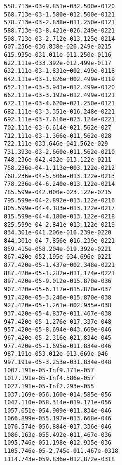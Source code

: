 \begin{alltt}
  55   8.713e-03  -9.851e-03   2.500e-01   20
  56   8.713e-03  -1.580e-01   2.500e-01   21
  57   8.713e-03  -2.838e-01   1.250e-01   21
  58   8.713e-03  -8.421e-02   6.249e-02   21
  59   8.713e-03  -2.712e-01   3.125e-02   14
  60   7.256e-03   6.838e-02   6.249e-02   15
  61   5.935e-03   1.011e-01   1.250e-01   16
  62   2.111e-03   3.392e-01   2.499e-01   17
  63   2.111e-03  -1.831e+00   2.499e-01   18
  64   2.111e-03  -1.826e+00   2.499e-01   19
  65   2.111e-03  -3.941e-01   2.499e-01   20
  66   2.111e-03  -3.192e-01   2.499e-01   21
  67   2.111e-03  -4.620e-02   1.250e-01   21
  68   2.111e-03  -3.351e-01   6.248e-02   21
  69   2.111e-03  -7.616e-02   3.124e-02   21
  70   2.111e-03  -6.614e-02   1.562e-02    7
  71   2.111e-03  -1.366e-01   1.562e-02    8
  72   2.111e-03   3.646e-04   1.562e-02    9
  73   1.393e-03  -2.660e-01   1.562e-02   10
  74   8.236e-04   2.432e-01   3.122e-02   11
  75   8.236e-04  -1.113e+00   3.122e-02   12
  76   8.236e-04  -5.506e-01   3.122e-02   13
  77   8.236e-04  -6.240e-01   3.122e-02   14
  78   5.599e-04   2.000e-02   3.122e-02   15
  79   5.599e-04  -2.892e-01   3.122e-02   16
  80   5.599e-04  -4.183e-01   3.122e-02   17
  81   5.599e-04  -4.180e-01   3.122e-02   18
  82   5.599e-04  -2.841e-01   3.122e-02   19
  83   4.301e-04   1.206e-01   6.239e-02   20
  84   4.301e-04  -7.856e-01   6.239e-02   21
  85   9.415e-05   8.204e-01   9.392e-02   21
  86   7.420e-05   2.195e-03   4.696e-02   21
  87   7.420e-05  -1.437e+00   2.348e-02   21
  88   7.420e-05  -1.282e-01   1.174e-02   21
  89   7.420e-05  -9.012e-01   5.870e-03    6
  90   7.420e-05  -6.117e-01   5.870e-03    7
  91   7.420e-05  -3.246e-01   5.870e-03    8
  92   7.420e-05  -1.261e+00   2.935e-03    8
  93   7.420e-05  -4.837e-01   1.467e-03    8
  94   7.420e-05  -1.276e-01   7.337e-04    8
  95   7.420e-05  -8.694e-04   3.669e-04    6
  96   7.420e-05  -2.316e-02   1.834e-04    5
  97   7.420e-05  -1.695e-01   1.834e-04    6
  98   7.191e-05   3.012e-01   3.669e-04    6
  99   7.191e-05  -3.253e-03   1.834e-04    8
 100   7.191e-05        -Inf   9.171e-05    7
 101   7.191e-05        -Inf   4.586e-05    7
 102   7.191e-05        -Inf   2.293e-05    5
 103   7.169e-05   6.160e-01   4.585e-05    6
 104   7.110e-05   8.314e-01   9.171e-05    6
 105   7.051e-05   4.909e-01   1.834e-04    6
 106   6.899e-05   5.197e-01   3.668e-04    6
 107   6.574e-05   6.884e-01   7.336e-04    6
 108   6.163e-05   5.492e-01   1.467e-03    6
 109   5.746e-05   1.198e-01   2.935e-03    6
 110   5.746e-05  -2.745e-01   1.467e-03   18
 111   4.743e-05   9.836e-01   2.872e-03   18

\end{alltt}
